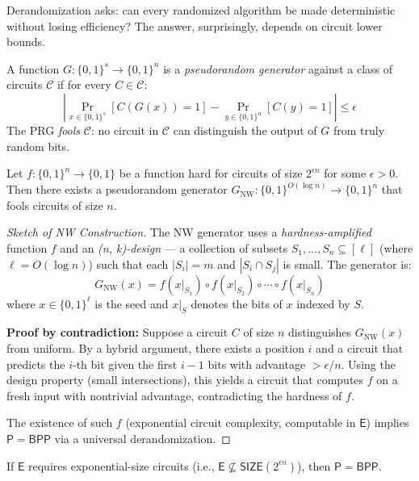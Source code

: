 Derandomization asks: can every randomized algorithm be made deterministic without losing efficiency? The answer, surprisingly, depends on circuit lower bounds.

\begin{definition}
A function $G: \{0,1\}^s \to \{0,1\}^n$ is a \emph{pseudorandom generator} against a class of circuits $\mathcal{C}$ if for every $C \in \mathcal{C}$:
\[
\left| \Pr_{x \in \{0,1\}^s}[C(G(x)) = 1] - \Pr_{y \in \{0,1\}^n}[C(y) = 1] \right| \le \epsilon
\]
The PRG \emph{fools} $\mathcal{C}$: no circuit in $\mathcal{C}$ can distinguish the output of $G$ from truly random bits.
\end{definition}

\begin{theorem}
Let $f: \{0,1\}^n \to \{0,1\}$ be a function hard for circuits of size $2^{\epsilon n}$ for some $\epsilon > 0$. Then there exists a pseudorandom generator $G_{\text{NW}}: \{0,1\}^{O(\log n)} \to \{0,1\}^n$ that fools circuits of size $n$.
\end{theorem}

\begin{proof}[Sketch of NW Construction]
The NW generator uses a \emph{hardness-amplified} function $f$ and an \emph{(n, k)-design} — a collection of subsets $S_1, \dots, S_n \subseteq [\ell]$ (where $\ell = O(\log n)$) such that each $|S_i| = m$ and $|S_i \cap S_j|$ is small. The generator is:
\[
G_{\text{NW}}(x) = f(x|_{S_1}) \circ f(x|_{S_2}) \circ \cdots \circ f(x|_{S_n})
\]
where $x \in \{0,1\}^\ell$ is the seed and $x|_S$ denotes the bits of $x$ indexed by $S$.

\textbf{Proof by contradiction:} Suppose a circuit $C$ of size $n$ distinguishes $G_{\text{NW}}(x)$ from uniform. By a hybrid argument, there exists a position $i$ and a circuit that predicts the $i$-th bit given the first $i-1$ bits with advantage $> \epsilon/n$. Using the design property (small intersections), this yields a circuit that computes $f$ on a fresh input with nontrivial advantage, contradicting the hardness of $f$.

The existence of such $f$ (exponential circuit complexity, computable in $\mathsf{E}$) implies $\mathsf{P} = \mathsf{BPP}$ via a universal derandomization.
\end{proof}

\begin{theorem}
If $\mathsf{E}$ requires exponential-size circuits (i.e., $\mathsf{E} \not\subseteq \mathsf{SIZE}(2^{\epsilon n})$), then $\mathsf{P} = \mathsf{BPP}$.
\end{theorem}


